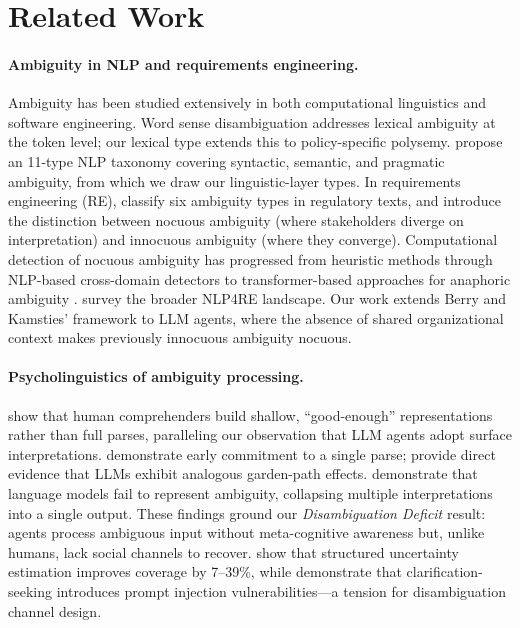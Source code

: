 \section{Related Work}
\label{sec:related_work}

\paragraph{Ambiguity in NLP and requirements engineering.}
Ambiguity has been studied extensively in both computational linguistics and software engineering. Word sense disambiguation \citep{navigli_wsd_2009} addresses lexical ambiguity at the token level; our lexical type extends this to policy-specific polysemy. \citet{li_ambiguity_taxonomy_2024} propose an 11-type NLP taxonomy covering syntactic, semantic, and pragmatic ambiguity, from which we draw our linguistic-layer types. In requirements engineering (RE), \citet{massey_ambiguity_re_2014} classify six ambiguity types in regulatory texts, and \citet{berry_kamsties_2004} introduce the distinction between nocuous ambiguity (where stakeholders diverge on interpretation) and innocuous ambiguity (where they converge). Computational detection of nocuous ambiguity has progressed from heuristic methods \citep{chantree_2006,willis_nocuous_2008} through NLP-based cross-domain detectors \citep{ferrari_ambiguity_2019,ferrari_defects_2018} to transformer-based approaches for anaphoric ambiguity \citep{ezzini_taphsir_2022,ezzini_anaphoric_2022}. \citet{zhao_nlp4re_2021} survey the broader NLP4RE landscape. Our work extends Berry and Kamsties' framework to LLM agents, where the absence of shared organizational context makes previously innocuous ambiguity nocuous.

\paragraph{Psycholinguistics of ambiguity processing.}
\citet{ferreira_good_enough_2002} show that human comprehenders build shallow, ``good-enough'' representations rather than full parses, paralleling our observation that LLM agents adopt surface interpretations. \citet{frazier_rayner_1982} demonstrate early commitment to a single parse; \citet{li_garden_path_llm_2024} provide direct evidence that LLMs exhibit analogous garden-path effects. \citet{liu_ambiguity_2023} demonstrate that language models fail to represent ambiguity, collapsing multiple interpretations into a single output. These findings ground our \emph{Disambiguation Deficit} result: agents process ambiguous input without meta-cognitive awareness but, unlike humans, lack social channels to recover. \citet{suri_structured_2025} show that structured uncertainty estimation improves coverage by 7--39\%, while \citet{sehwag_aspi_2026} demonstrate that clarification-seeking introduces prompt injection vulnerabilities---a tension for disambiguation channel design.

